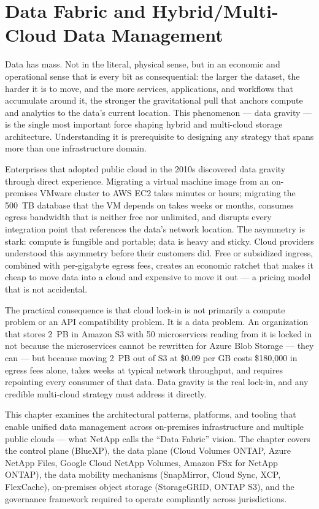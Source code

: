 \chapter{Data Fabric and Hybrid/Multi-Cloud Data Management}
\label{ch:16}

Data has mass. Not in the literal, physical sense, but in an economic and
operational sense that is every bit as consequential: the larger the dataset,
the harder it is to move, and the more services, applications, and workflows
that accumulate around it, the stronger the gravitational pull that anchors
compute and analytics to the data's current location. This phenomenon --- data
gravity --- is the single most important force shaping hybrid and multi-cloud
storage architecture. Understanding it is prerequisite to designing any
strategy that spans more than one infrastructure domain.

Enterprises that adopted public cloud in the 2010s discovered data gravity
through direct experience. Migrating a virtual machine image from an
on-premises VMware cluster to AWS EC2 takes minutes or hours; migrating the
500~TB database that the VM depends on takes weeks or months, consumes egress
bandwidth that is neither free nor unlimited, and disrupts every integration
point that references the data's network location. The asymmetry is stark:
compute is fungible and portable; data is heavy and sticky. Cloud providers
understood this asymmetry before their customers did. Free or subsidized
ingress, combined with per-gigabyte egress fees, creates an economic ratchet
that makes it cheap to move data into a cloud and expensive to move it out ---
a pricing model that is not accidental.

The practical consequence is that cloud lock-in is not primarily a compute
problem or an API compatibility problem. It is a data problem. An organization
that stores 2~PB in Amazon S3 with 50 microservices reading from it is locked
in not because the microservices cannot be rewritten for Azure Blob Storage ---
they can --- but because moving 2~PB out of S3 at \$0.09 per GB costs
\$180,000 in egress fees alone, takes weeks at typical network throughput, and
requires repointing every consumer of that data. Data gravity is the real
lock-in, and any credible multi-cloud strategy must address it directly.

This chapter examines the architectural patterns, platforms, and tooling that
enable unified data management across on-premises infrastructure and multiple
public clouds --- what NetApp calls the ``Data Fabric'' vision. The chapter
covers the control plane (BlueXP), the data plane (Cloud Volumes ONTAP, Azure
NetApp Files, Google Cloud NetApp Volumes, Amazon FSx for NetApp ONTAP), the
data mobility mechanisms (SnapMirror, Cloud Sync, XCP, FlexCache),
on-premises object storage (StorageGRID, ONTAP S3), and the governance
framework required to operate compliantly across jurisdictions.

